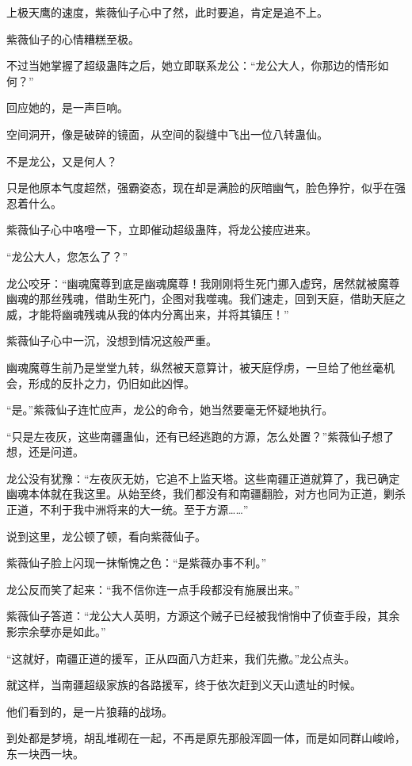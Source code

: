 \begin{this_body}
上极天鹰的速度，紫薇仙子心中了然，此时要追，肯定是追不上。

紫薇仙子的心情糟糕至极。

不过当她掌握了超级蛊阵之后，她立即联系龙公：“龙公大人，你那边的情形如何？”

回应她的，是一声巨响。

空间洞开，像是破碎的镜面，从空间的裂缝中飞出一位八转蛊仙。

不是龙公，又是何人？

只是他原本气度超然，强霸姿态，现在却是满脸的灰暗幽气，脸色狰狞，似乎在强忍着什么。

紫薇仙子心中咯噔一下，立即催动超级蛊阵，将龙公接应进来。

“龙公大人，您怎么了？”

龙公咬牙：“幽魂魔尊到底是幽魂魔尊！我刚刚将生死门挪入虚窍，居然就被魔尊幽魂的那丝残魂，借助生死门，企图对我噬魂。我们速走，回到天庭，借助天庭之威，才能将幽魂残魂从我的体内分离出来，并将其镇压！”

紫薇仙子心中一沉，没想到情况这般严重。

幽魂魔尊生前乃是堂堂九转，纵然被天意算计，被天庭俘虏，一旦给了他丝毫机会，形成的反扑之力，仍旧如此凶悍。

“是。”紫薇仙子连忙应声，龙公的命令，她当然要毫无怀疑地执行。

“只是左夜灰，这些南疆蛊仙，还有已经逃跑的方源，怎么处置？”紫薇仙子想了想，还是问道。

龙公没有犹豫：“左夜灰无妨，它追不上监天塔。这些南疆正道就算了，我已确定幽魂本体就在我这里。从始至终，我们都没有和南疆翻脸，对方也同为正道，剿杀正道，不利于我中洲将来的大一统。至于方源……”

说到这里，龙公顿了顿，看向紫薇仙子。

紫薇仙子脸上闪现一抹惭愧之色：“是紫薇办事不利。”

龙公反而笑了起来：“我不信你连一点手段都没有施展出来。”

紫薇仙子答道：“龙公大人英明，方源这个贼子已经被我悄悄中了侦查手段，其余影宗余孽亦是如此。”

“这就好，南疆正道的援军，正从四面八方赶来，我们先撤。”龙公点头。

就这样，当南疆超级家族的各路援军，终于依次赶到义天山遗址的时候。

他们看到的，是一片狼藉的战场。

到处都是梦境，胡乱堆砌在一起，不再是原先那般浑圆一体，而是如同群山峻岭，东一块西一块。


\end{this_body}
